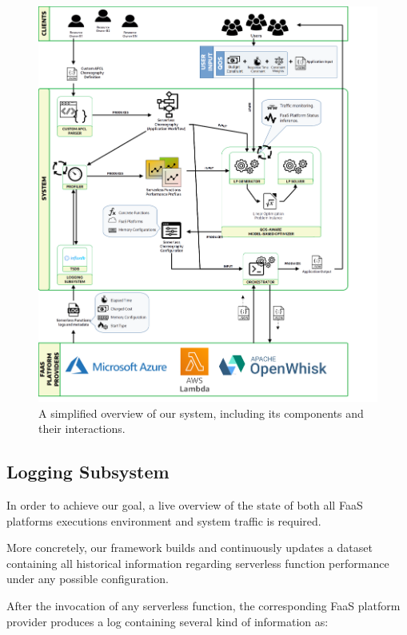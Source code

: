 \documentclass[12pt,a4paper]{report}
\begin{document}
\begin{figure}[h!]
	\centering
	\includegraphics[width=\textwidth, height=0.9\textheight]{./Images/System.png}
	\caption{A simplified overview of our system, including its components and their interactions.}%
	\label{Overview}
\end{figure}

\subsection{Logging Subsystem}

In order to achieve our goal, a live overview of the state of both all FaaS platforms executions environment and system traffic is required.

More concretely, our framework builds and continuously updates a dataset containing all historical information regarding serverless function performance under any possible configuration.

After the invocation of any serverless function, the corresponding FaaS platform provider produces a log containing several kind of information as:   
\end{document}
